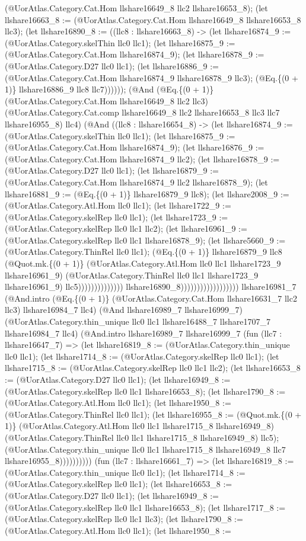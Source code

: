 \documentclass[11pt]{article}
\begin{document}
(@UorAtlas.Category.Cat.Hom llshare16649\_8 llc2 llshare16653\_8); (let llshare16663\_8 := (@UorAtlas.Category.Cat.Hom llshare16649\_8 llshare16653\_8 llc3); (let llshare16890\_8 := ((llc8 : llshare16663\_8) -> (let llshare16874\_9 := (@UorAtlas.Category.skelThin llc0 llc1); (let llshare16875\_9 := (@UorAtlas.Category.Cat.Hom llshare16874\_9); (let llshare16878\_9 := (@UorAtlas.Category.D27 llc0 llc1); (let llshare16886\_9 := (@UorAtlas.Category.Cat.Hom llshare16874\_9 llshare16878\_9 llc3); (@Eq.\{(0 + 1)\} llshare16886\_9 llc8 llc7)))))); (@And (@Eq.\{(0 + 1)\} (@UorAtlas.Category.Cat.Hom llshare16649\_8 llc2 llc3) (@UorAtlas.Category.Cat.comp llshare16649\_8 llc2 llshare16653\_8 llc3 llc7 llshare16955\_8) llc4) (@And ((llc8 : llshare16654\_8) -> (let llshare16874\_9 := (@UorAtlas.Category.skelThin llc0 llc1); (let llshare16875\_9 := (@UorAtlas.Category.Cat.Hom llshare16874\_9); (let llshare16876\_9 := (@UorAtlas.Category.Cat.Hom llshare16874\_9 llc2); (let llshare16878\_9 := (@UorAtlas.Category.D27 llc0 llc1); (let llshare16879\_9 := (@UorAtlas.Category.Cat.Hom llshare16874\_9 llc2 llshare16878\_9); (let llshare16881\_9 := (@Eq.\{(0 + 1)\} llshare16879\_9 llc8); (let llshare2008\_9 := (@UorAtlas.Category.Atl.Hom llc0 llc1); (let llshare1722\_9 := (@UorAtlas.Category.skelRep llc0 llc1); (let llshare1723\_9 := (@UorAtlas.Category.skelRep llc0 llc1 llc2); (let llshare16961\_9 := (@UorAtlas.Category.skelRep llc0 llc1 llshare16878\_9); (let llshare5660\_9 := (@UorAtlas.Category.ThinRel llc0 llc1); (@Eq.\{(0 + 1)\} llshare16879\_9 llc8 (@Quot.mk.\{(0 + 1)\} (@UorAtlas.Category.Atl.Hom llc0 llc1 llshare1723\_9 llshare16961\_9) (@UorAtlas.Category.ThinRel llc0 llc1 llshare1723\_9 llshare16961\_9) llc5)))))))))))))) llshare16890\_8)))))))))))))))))) llshare16981\_7 (@And.intro (@Eq.\{(0 + 1)\} (@UorAtlas.Category.Cat.Hom llshare16631\_7 llc2 llc3) llshare16984\_7 llc4) (@And llshare16989\_7 llshare16999\_7) (@UorAtlas.Category.thin\_unique llc0 llc1 llshare16488\_7 llshare1707\_7 llshare16984\_7 llc4) (@And.intro llshare16989\_7 llshare16999\_7 (fun (llc7 : llshare16647\_7) => (let llshare16819\_8 := (@UorAtlas.Category.thin\_unique llc0 llc1); (let llshare1714\_8 := (@UorAtlas.Category.skelRep llc0 llc1); (let llshare1715\_8 := (@UorAtlas.Category.skelRep llc0 llc1 llc2); (let llshare16653\_8 := (@UorAtlas.Category.D27 llc0 llc1); (let llshare16949\_8 := (@UorAtlas.Category.skelRep llc0 llc1 llshare16653\_8); (let llshare1790\_8 := (@UorAtlas.Category.Atl.Hom llc0 llc1); (let llshare1950\_8 := (@UorAtlas.Category.ThinRel llc0 llc1); (let llshare16955\_8 := (@Quot.mk.\{(0 + 1)\} (@UorAtlas.Category.Atl.Hom llc0 llc1 llshare1715\_8 llshare16949\_8) (@UorAtlas.Category.ThinRel llc0 llc1 llshare1715\_8 llshare16949\_8) llc5); (@UorAtlas.Category.thin\_unique llc0 llc1 llshare1715\_8 llshare16949\_8 llc7 llshare16955\_8)))))))))) (fun (llc7 : llshare16661\_7) => (let llshare16819\_8 := (@UorAtlas.Category.thin\_unique llc0 llc1); (let llshare1714\_8 := (@UorAtlas.Category.skelRep llc0 llc1); (let llshare16653\_8 := (@UorAtlas.Category.D27 llc0 llc1); (let llshare16949\_8 := (@UorAtlas.Category.skelRep llc0 llc1 llshare16653\_8); (let llshare1717\_8 := (@UorAtlas.Category.skelRep llc0 llc1 llc3); (let llshare1790\_8 := (@UorAtlas.Category.Atl.Hom llc0 llc1); (let llshare1950\_8 := 
\end{document}
